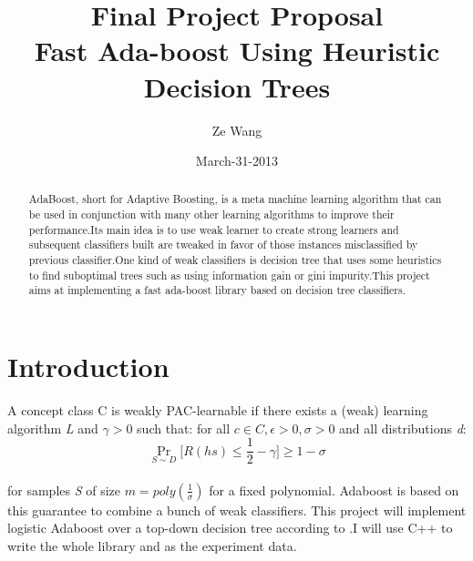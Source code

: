 \documentclass[11pt,twocolumn]{article}
\title{Final Project Proposal \\ Fast Ada-boost Using Heuristic Decision Trees}
\author{ Ze Wang }
\date{March-31-2013}
\begin{document}
\ifpdf
{}
\else
{}
\fi

\maketitle


\begin{abstract}
\par{AdaBoost, short for Adaptive Boosting, is a meta machine learning algorithm that can be used in conjunction with many other learning algorithms to improve their performance.Its main idea is to use weak learner to create strong learners and subsequent classifiers built
are tweaked in favor of those instances misclassified by previous classifier.One kind of weak classifiers is decision tree that uses some
heuristics to find suboptimal trees such as using information gain or gini impurity.This project aims at implementing 
a fast ada-boost library based on decision tree classifiers.}
\end{abstract}

\section{Introduction}
\par{A concept class C is weakly PAC-learnable if there exists a (weak) learning algorithm \textit{L} and $\gamma > 0$ such that: 
for all $ c \in C, \epsilon >0, \sigma >0 $ and all distributions \textit{d}:\\
\[\Pr_{S \sim D} {[}R(hs) \leq \frac{1}{2} - \gamma{]} \geq 1 - \sigma\]\\
for samples \textit{S} of size $m = poly(\frac{1}{\sigma} )$ for a fixed polynomial. Adaboost is based on this guarantee to
combine a bunch of weak classifiers. This project will implement logistic Adaboost over a top-down decision tree according to
\cite{Fast_Tree}.I will use C++ to write the whole library and \cite{Record_Linkage} as the experiment data.}
\end{document}
